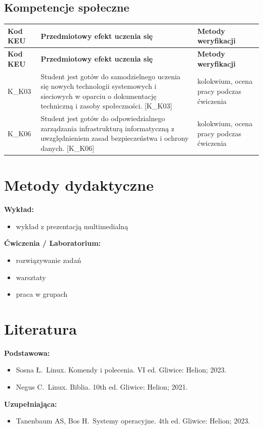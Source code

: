 \documentclass[12pt, a4paper]{article}
\newcommand{\thdrule}{\noalign{\global\setlength{\extrarowheight}{0pt}}}
\newcommand{\thdend}{\noalign{\global\setlength{\extrarowheight}{3pt}}}
\begin{document}
\subsection*{Kompetencje społeczne}
{\scriptsize
\begin{longtable}{m{1.6cm}m{9.0cm}m{4.2cm}}
\thdrule\toprule
\rowcolor{pjatkRed} {\color{white}\footnotesize\textbf{\vphantom{Ag}Kod KEU}} & {\color{white}\footnotesize\textbf{\vphantom{Ag}Przedmiotowy efekt uczenia się}} & {\color{white}\footnotesize\textbf{\vphantom{Ag}Metody weryfikacji}} \\
\midrule\thdend
\endfirsthead
\thdrule\toprule
\rowcolor{pjatkRed} {\color{white}\footnotesize\textbf{\vphantom{Ag}Kod KEU}} & {\color{white}\footnotesize\textbf{\vphantom{Ag}Przedmiotowy efekt uczenia się}} & {\color{white}\footnotesize\textbf{\vphantom{Ag}Metody weryfikacji}} \\
\midrule\thdend
\endhead
  \rowcolor{tableRowLight} K\_K03 & Student jest gotów do samodzielnego uczenia się nowych technologii systemowych i sieciowych w oparciu o dokumentację techniczną i zasoby społeczności. {[}K\_K03{]} & kolokwium, ocena pracy podczas ćwiczenia \\
  \rowcolor{tableRowAlt} K\_K06 & Student jest gotów do odpowiedzialnego zarządzania infrastrukturą informatyczną z uwzględnieniem zasad bezpieczeństwa i ochrony danych. {[}K\_K06{]} & kolokwium, ocena pracy podczas ćwiczenia \\
\bottomrule
\end{longtable}}

\section{Metody dydaktyczne}

\textbf{Wykład:}
\begin{itemize}
  \item wykład z prezentacją multimedialną
\end{itemize}
\vspace{4pt}
\textbf{Ćwiczenia / Laboratorium:}
\begin{itemize}
  \item rozwiązywanie zadań
  \item warsztaty
  \item praca w grupach
\end{itemize}
\vspace{4pt}


\section{Literatura}

\textbf{Podstawowa:}
\begin{itemize}
  \item Sosna Ł. Linux. Komendy i polecenia. VI ed. Gliwice: Helion; 2023.
  \item Negus C. Linux. Biblia. 10th ed. Gliwice: Helion; 2021.
\end{itemize}

\textbf{Uzupełniająca:}
\begin{itemize}
  \item Tanenbaum AS, Bos H. Systemy operacyjne. 4th ed. Gliwice: Helion; 2023.
\end{itemize}
\end{document}
